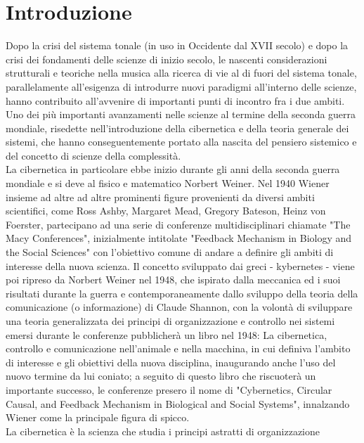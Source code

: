 \section{Introduzione}
\label{sec:Introduzione}

Dopo la crisi del sistema tonale (in uso in Occidente dal XVII secolo)
e dopo la crisi dei fondamenti delle scienze di inizio secolo,
le nascenti considerazioni strutturali e teoriche
nella musica alla ricerca di vie al di fuori del sistema tonale,
parallelamente all'esigenza di introdurre nuovi paradigmi all'interno delle scienze,
hanno contribuito all'avvenire di importanti punti di incontro fra i due ambiti.
\\
Uno dei più importanti avanzamenti nelle scienze
al termine della seconda guerra mondiale, risedette nell'introduzione della
cibernetica e della teoria generale dei sistemi, che hanno conseguentemente
portato alla nascita del pensiero sistemico e del concetto di scienze della complessità.
\\
La cibernetica in particolare ebbe inizio durante gli anni della seconda guerra mondiale e si deve al fisico e matematico Norbert Weiner.
Nel 1940 Wiener insieme ad altre ad altre prominenti figure provenienti da diversi ambiti scientifici,
come Ross Ashby, Margaret Mead, Gregory Bateson, Heinz von Foerster, partecipano ad una serie di conferenze
multidisciplinari chiamate "The Macy Conferences", inizialmente intitolate
"Feedback Mechanism in Biology and the Social Sciences" con l'obiettivo comune di andare a definire
gli ambiti di interesse della nuova scienza.
Il concetto sviluppato dai greci - kybernetes -
viene poi ripreso da Norbert Weiner nel 1948,
che ispirato dalla meccanica ed i suoi risultati durante la guerra
e contemporaneamente dallo sviluppo della teoria della comunicazione (o informazione) di Claude Shannon,
con la volontà di sviluppare una teoria generalizzata dei principi di
organizzazione e controllo nei sistemi emersi durante le conferenze pubblicherà un libro nel 1948:
La cibernetica, controllo e comunicazione nell'animale e nella macchina,
in cui definiva l'ambito di interesse e gli obiettivi della nuova disciplina,
inaugurando anche l'uso del nuovo termine da lui coniato; a seguito di questo libro che riscuoterà
un importante successo, le conferenze presero il nome di
"Cybernetics, Circular Causal, and Feedback Mechanism in Biological and Social Systems",
innalzando Wiener come la principale figura di spicco.
\\
La cibernetica è la scienza che studia i principi astratti di organizzazione
